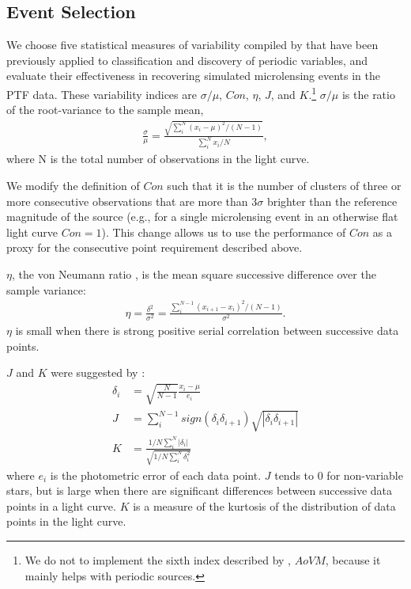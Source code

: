 \documentclass[12pt,preprint]{aastex}
\begin{document}
\subsection{Event Selection} \label{sec:event_selection}
We choose five statistical measures of variability compiled by \cite{shin2009} that have been previously applied to classification and discovery of periodic variables, and evaluate their effectiveness in recovering simulated microlensing events in the PTF data. These variability indices are $\sigma/\mu$, $Con$, $\eta$, $J$, and $K$.\footnote{We do not to implement the sixth index described by \cite{shin2009}, $AoVM$, because it mainly helps with periodic sources.} $\sigma/\mu$ is the ratio of the root-variance to the sample mean, 
\begin{align}
	\frac{\sigma}{\mu} = \frac{\sqrt{\sum^N_i (x_i - \mu)^2 / (N-1)}}{\sum^N_i x_i/N},
\end{align}
where N is the total number of observations in the light curve. 

We modify the definition of $Con$ such that it is the number of clusters of three or more consecutive observations that are more than $3\sigma$ brighter than the reference magnitude of the source (e.g., for a single microlensing event in an otherwise flat light curve $Con=1$). This change allows us to use the performance of $Con$ as a proxy for the consecutive point requirement described above. 

$\eta$, the von Neumann ratio \citep{von_neumann1941}, is the mean square successive difference over the sample variance:
\begin{align}
	\eta = \frac{\delta^2}{\sigma^2} = \frac{\sum^{N-1}_i(x_{i+1} - x_i)^2/(N-1)}{\sigma^2}.
\end{align}
$\eta$ is small when there is strong positive serial correlation between successive data points. 

$J$ and $K$ were suggested by \cite{stetson1996}:
\begin{align}
	\delta_i &= \sqrt{\frac{N}{N-1}}\frac{x_i-\mu}{e_i}\\
	J &= \sum^{N-1}_i sign(\delta_i \delta_{i+1})\sqrt{|\delta_i \delta_{i+1}|}\\
	K &= \frac{1/N\sum^N_i |\delta_i|}{\sqrt{1/N\sum^N_i\delta_i^2}}
\end{align}
where $e_i$ is the photometric error of each data point. $J$ tends to 0 for non-variable stars, but is large when there are significant differences between successive data points in a light curve. $K$ is a measure of the kurtosis of the distribution of data points in the light curve.
\end{document}
